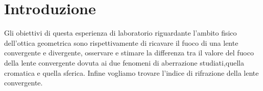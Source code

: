 \section{Introduzione}

Gli obiettivi di questa esperienza di laboratorio riguardante l'ambito fisico dell'ottica geometrica sono rispettivamente di ricavare il fuoco di una lente convergente e divergente, osservare e stimare la differenza tra il valore del fuoco della lente convergente  dovuta ai due fenomeni di aberrazione studiati,quella cromatica e quella sferica. Infine vogliamo trovare l'indice di rifrazione della lente convergente. 

